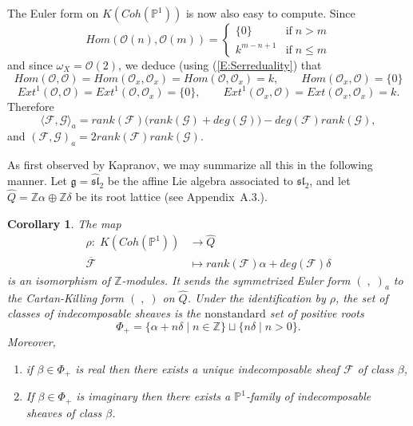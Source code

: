 \documentclass[a4paper,10pt]{amsart}
\def\Z{\mathbb{Z}}
\def\a{\alpha}
\def\O{\mathcal{O}}
\def\g{\mathfrak{g}}
\newtheorem{cor}[theo]{Corollary}
\numberwithin{equation}{section}
\begin{document}
The Euler form on $K(Coh(\mathbb{P}^1))$ is now also easy to compute. Since
$${Hom}(\O(n),\O(m))=\begin{cases} \{0\} & \text{if}\; n > m\\
k^{m-n+1} & \text{if}\; n \leq m\end{cases}$$
and since $\omega_X=\O(2)$, we deduce (using (\ref{E:Serreduality}) that
$${Hom}(\O,\O)={Hom}(\O_x,\O_x)={Hom}(\O,\O_x)=k,\qquad {Hom}(\O_x,\O)=\{0\}$$
$${Ext}^1(\O,\O)={Ext}^1(\O,\O_x)=\{0\}, \qquad {Ext}^1(\O_x,\O)= {Ext}(\O_x,\O_x)=k.$$
Therefore
\begin{equation}\label{E:EulerP1}
\langle \mathcal{F},\mathcal{G} \rangle_a=rank(\mathcal{F})\big( rank(\mathcal{G}) + deg(\mathcal{G})\big) -deg(\mathcal{F})rank(\mathcal{G}),
\end{equation}
and $( \mathcal{F},\mathcal{G} )_a=2 rank(\mathcal{F}) rank(\mathcal{G})$.

\vspace{.1in}

As first observed by Kapranov, we may summarize all this in the following manner. Let $\g=\widehat{\mathfrak{sl}}_2$ be the affine Lie algebra associated to $\mathfrak{sl}_2$, and let $\widehat{Q}=\Z \a \oplus \Z\delta$ be its root lattice (see Appendix~A.3.).

\vspace{.1in}

\begin{cor}\label{C:KacP1} The map
\begin{align*}
\rho:\;K(Coh(\mathbb{P}^1)) &\to \widehat{Q}\\
\overline{\mathcal{F}} &\mapsto rank(\mathcal{F}) \a + deg(\mathcal{F})\delta
\end{align*}
is an isomorphism of $\Z$-modules. It sends the symmetrized Euler form $(\;,\;)_a$ to the Cartan-Killing form $(\;,\;)$ on $\widehat{Q}$. Under the identification by $\rho$, the set of classes of indecomposable sheaves is the $\mathrm{nonstandard}$ set of positive roots
\begin{equation}\label{E:nonstandardphi}
\Phi_+=\{\a + n\delta\;|\; n \in \Z\} \sqcup \{n \delta\;|\; n >0\}.
\end{equation}
Moreover,
\begin{enumerate}
\item[i)] if $\beta \in \Phi_+$ is real then there exists a unique indecomposable sheaf $\mathcal{F}$ of class $\beta$,
\item[ii)] If $\beta \in \Phi_+$ is imaginary then there exists a $\mathbb{P}^1$-family of indecomposable sheaves of class $\beta$.
\end{enumerate}
\end{cor}
\end{document}
